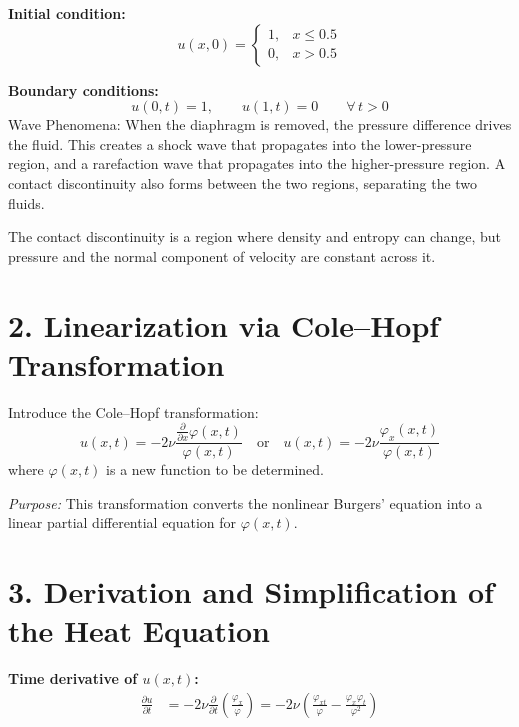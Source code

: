 \documentclass[12pt]{article}
\begin{document}
\textbf{Initial condition:}
\[
u(x, 0) =
\begin{cases}
1, & x \leq 0.5 \\
0, & x > 0.5
\end{cases}
\]

\textbf{Boundary conditions:}
\[
u(0, t) = 1, \qquad u(1, t) = 0 \qquad \forall\, t > 0
\]
 Wave Phenomena:
When the diaphragm is removed, the pressure difference drives the fluid. This creates a shock wave that propagates into the lower-pressure region, and a rarefaction wave that propagates into the higher-pressure region.
A contact discontinuity also forms between the two regions, separating the two fluids.  



The contact discontinuity is a region where density and entropy can change, but pressure and the normal component of velocity are constant across it. 




\section*{2. Linearization via Cole--Hopf Transformation}

Introduce the Cole--Hopf transformation:
\begin{equation}
u(x, t) = -2\nu \frac{\frac{\partial}{\partial x} \varphi(x, t)}{\varphi(x, t)}
\quad \text{or} \quad
u(x, t) = -2\nu \frac{\varphi_x(x, t)}{\varphi(x, t)}
\end{equation}
where $\varphi(x, t)$ is a new function to be determined.

\textit{Purpose:} This transformation converts the nonlinear Burgers' equation into a linear partial differential equation for $\varphi(x, t)$.

\section*{3. Derivation and Simplification of the Heat Equation}

\textbf{Time derivative of $u(x, t)$:}
\begin{align*}
\frac{\partial u}{\partial t}
&= -2\nu \frac{\partial}{\partial t} \left( \frac{\varphi_x}{\varphi} \right )
= -2\nu \left( \frac{\varphi_{xt}}{\varphi} - \frac{\varphi_x \varphi_t}{\varphi^2} \right )
\end{align*}
\end{document}

